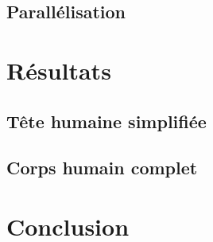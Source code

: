 \documentclass[
	10pt,
]{beamer}
\begin{document}

\subsection{Parallélisation} %











\section{Résultats}

\subsection{Tête humaine simplifiée}


\subsection{Corps humain complet}



\section{Conclusion}
\end{document}

